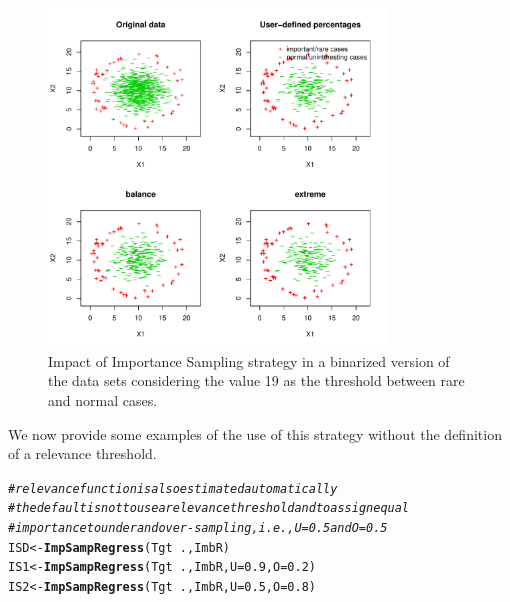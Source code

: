 \documentclass[10pt,a4paper]{article}\usepackage[]{graphicx}\usepackage[]{color}
\makeatletter
\newcommand{\hlnum}[1]{\textcolor[rgb]{0.686,0.059,0.569}{#1}}%
\newcommand{\hlcom}[1]{\textcolor[rgb]{0.678,0.584,0.686}{\textit{#1}}}%
\newcommand{\hlopt}[1]{\textcolor[rgb]{0,0,0}{#1}}%
\newcommand{\hlstd}[1]{\textcolor[rgb]{0.345,0.345,0.345}{#1}}%
\newcommand{\hlkwb}[1]{\textcolor[rgb]{0.69,0.353,0.396}{#1}}%
\newcommand{\hlkwc}[1]{\textcolor[rgb]{0.333,0.667,0.333}{#1}}%
\newcommand{\hlkwd}[1]{\textcolor[rgb]{0.737,0.353,0.396}{\textbf{#1}}}%
\newenvironment{kframe}{%
 \def\at@end@of@kframe{}%
 \ifinner\ifhmode%
  \def\at@end@of@kframe{\end{minipage}}%
  \begin{minipage}{\columnwidth}%
 \fi\fi%
 \def\FrameCommand##1{\hskip\@totalleftmargin \hskip-\fboxsep
 \colorbox{shadecolor}{##1}\hskip-\fboxsep
     \hskip-\linewidth \hskip-\@totalleftmargin \hskip\columnwidth}%
 \MakeFramed {\advance\hsize-\width
   \@totalleftmargin\z@ \linewidth\hsize
   \@setminipage}}%
 {\par\unskip\endMakeFramed%
 \at@end@of@kframe}
\newenvironment{knitrout}{}{} %
\makeatother
\begin{document}
\begin{knitrout}\footnotesize
{}\color{fgcolor}\begin{figure}

{\centering \includegraphics[width=0.8\textwidth]{figures/UBL-IS_plot2-1} 

}

\caption[Impact of Importance Sampling strategy in a binarized version of the data sets considering the value 19 as the threshold between rare and normal cases]{Impact of Importance Sampling strategy in a binarized version of the data sets considering the value 19 as the threshold between rare and normal cases.}\label{fig:IS_plot2}
\end{figure}


\end{knitrout}

We now provide some examples of the use of this strategy without the definition of a relevance threshold.

\begin{knitrout}\footnotesize
{}\color{fgcolor}\begin{kframe}
\begin{alltt}
\hlcom{# relevance function is also estimated automatically}
\hlcom{# the default is not to use a relevance threshold and to assign equal }
\hlcom{# importance to under and over-sampling, i.e., U=0.5 and O=0.5}
\hlstd{ISD} \hlkwb{<-} \hlkwd{ImpSampRegress}\hlstd{(Tgt}\hlopt{~}\hlstd{., ImbR)}
\hlstd{IS1} \hlkwb{<-} \hlkwd{ImpSampRegress}\hlstd{(Tgt}\hlopt{~}\hlstd{., ImbR,} \hlkwc{U}\hlstd{=}\hlnum{0.9}\hlstd{,} \hlkwc{O}\hlstd{=}\hlnum{0.2}\hlstd{)}
\hlstd{IS2} \hlkwb{<-} \hlkwd{ImpSampRegress}\hlstd{(Tgt}\hlopt{~}\hlstd{., ImbR,} \hlkwc{U}\hlstd{=}\hlnum{0.5}\hlstd{,} \hlkwc{O}\hlstd{=}\hlnum{0.8}\hlstd{)}
\end{alltt}
\end{kframe}
\end{knitrout}
\end{document}
